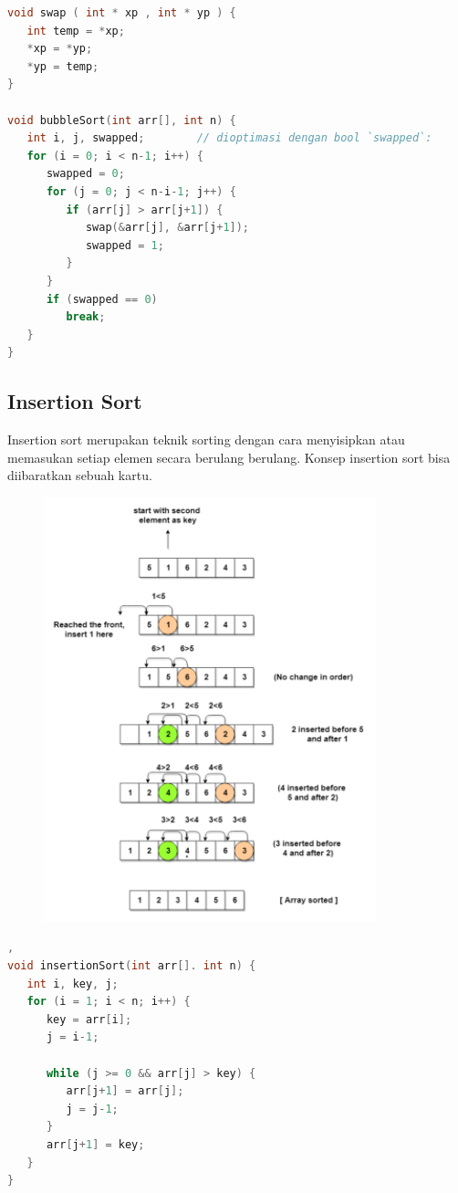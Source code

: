 \begin{lstlisting}[language=c,caption=Implementasi Bubble Sort]
void swap ( int * xp , int * yp ) {
   int temp = *xp;
   *xp = *yp;
   *yp = temp;
}

void bubbleSort(int arr[], int n) {
   int i, j, swapped;        // dioptimasi dengan bool `swapped`:
   for (i = 0; i < n-1; i++) {
      swapped = 0;
      for (j = 0; j < n-i-1; j++) {
         if (arr[j] > arr[j+1]) {
            swap(&arr[j], &arr[j+1]);
            swapped = 1;
         }
      }
      if (swapped == 0)
         break;
   }
}
\end{lstlisting}

\subsection{Insertion Sort}
Insertion sort merupakan teknik sorting dengan cara menyisipkan atau memasukan setiap elemen secara berulang berulang.
Konsep insertion sort bisa diibaratkan sebuah kartu. 

\begin{figure}[H]
    \centering
    \includegraphics[width=0.5\linewidth]{../P4/img/screenshot007.png}
    \caption{}
    \label{fig:tujuh}
\end{figure}
\begin{lstlisting}[language=c,caption=Implementasi Insertion Sort], 
void insertionSort(int arr[]. int n) {
   int i, key, j;
   for (i = 1; i < n; i++) {
      key = arr[i];
      j = i-1;
    
      while (j >= 0 && arr[j] > key) {
         arr[j+1] = arr[j];
         j = j-1;
      }
      arr[j+1] = key;
   }
}
\end{lstlisting}

